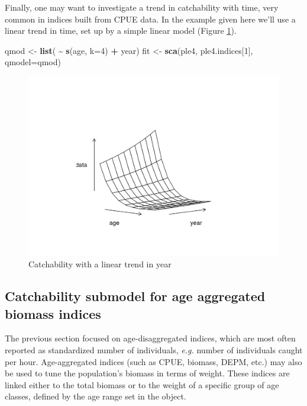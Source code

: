 \documentclass[
]{book}
\newenvironment{Shaded}{\begin{snugshade}}{\end{snugshade}}
\newcommand{\AttributeTok}[1]{\textcolor[rgb]{0.13,0.29,0.53}{#1}}
\newcommand{\DecValTok}[1]{\textcolor[rgb]{0.00,0.00,0.81}{#1}}
\newcommand{\FunctionTok}[1]{\textcolor[rgb]{0.13,0.29,0.53}{\textbf{#1}}}
\newcommand{\NormalTok}[1]{#1}
\newcommand{\OtherTok}[1]{\textcolor[rgb]{0.56,0.35,0.01}{#1}}
\newcommand{\SpecialCharTok}[1]{\textcolor[rgb]{0.81,0.36,0.00}{\textbf{#1}}}
\begin{document}
Finally, one may want to investigate a trend in catchability with time, very common in indices built from CPUE data. In the example given here we'll use a linear trend in time, set up by a simple linear model (Figure \ref{fig:qtrend}).

\begin{Shaded}
\begin{Highlighting}[]
\NormalTok{qmod }\OtherTok{\textless{}{-}} \FunctionTok{list}\NormalTok{( }\SpecialCharTok{\textasciitilde{}} \FunctionTok{s}\NormalTok{(age, }\AttributeTok{k=}\DecValTok{4}\NormalTok{) }\SpecialCharTok{+}\NormalTok{ year)}
\NormalTok{fit }\OtherTok{\textless{}{-}} \FunctionTok{sca}\NormalTok{(ple4, ple4.indices[}\DecValTok{1}\NormalTok{], }\AttributeTok{qmodel=}\NormalTok{qmod)}
\end{Highlighting}
\end{Shaded}

\begin{figure}
\centering
\includegraphics{_bookdown_files/_main_files/figure-html/qtrend-1.png}
\caption{\label{fig:qtrend}Catchability with a linear trend in year}
\end{figure}

\hypertarget{catchability-submodel-for-age-aggregated-biomass-indices}{%
\subsection{Catchability submodel for age aggregated biomass indices}\label{catchability-submodel-for-age-aggregated-biomass-indices}}

The previous section focused on age-disaggregated indices, which are most often reported as standardized number of individuals, \emph{e.g.} number of individuals caught per hour. Age-aggregated indices (such as CPUE, biomass, DEPM, etc.) may also be used to tune the population's biomass in terms of weight. These indices are linked either to the total biomass or to the weight of a specific group of age classes, defined by the age range set in the object.
\end{document}
